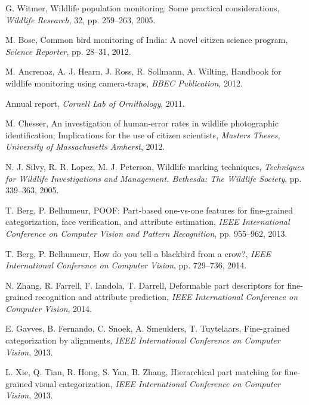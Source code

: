 \documentclass{article}
\begin{document}
\begin{thebibliography}{100}


G. Witmer, 
Wildlife population monitoring: Some practical considerations,
\emph{Wildlife Research}, 32, pp. 259--263, 2005. 

M. Bose, 
Common bird monitoring of India: A novel citizen science program, 
\emph{Science Reporter}, pp. 28--31, 2012. 

M. Ancrenaz, A. J. Hearn, J. Ross, R. Sollmann, A. Wilting, 
Handbook for wildlife monitoring using camera-traps,
\emph{BBEC Publication}, 2012. 

Annual report,
\emph{Cornell Lab of Ornithology}, 2011.

M. Chesser, 
An investigation of human-error rates in wildlife photographic identification; 
Implications for the use of citizen scientists, 
\emph{Masters Theses, University of Massachusetts Amherst}, 2012. 

N. J. Silvy, R. R. Lopez, M. J. Peterson, 
Wildlife marking techniques, 
\emph{Techniques for Wildlife Investigations and Management. Bethesda: The
Wildlife Society},
pp. 339--363, 2005. 

T. Berg, P. Belhumeur, 
POOF: Part-based one-vs-one features for fine-grained categorization, 
face verification, and attribute estimation,
\emph{IEEE International Conference on Computer Vision and Pattern Recognition},
pp. 955--962, 2013. 

T. Berg, P. Belhumeur, 
How do you tell a blackbird from a crow?, 
\emph{IEEE International Conference on Computer Vision},
pp. 729--736, 2014. 

N. Zhang, R. Farrell, F. Iandola, T. Darrell, 
Deformable part descriptors for fine-grained recognition and attribute prediction, 
\emph{IEEE International Conference on Computer Vision}, 2014. 

E. Gavves, B. Fernando, C. Snoek, A. Smeulders, T. Tuytelaars, 
Fine-grained categorization by alignments, 
\emph{IEEE International Conference on Computer Vision}, 2013. 

L. Xie, Q. Tian, R. Hong, S. Yan, B. Zhang, 
Hierarchical part matching for fine-grained visual categorization, 
\emph{IEEE International Conference on Computer Vision}, 2013. 


\end{thebibliography}
\end{document}

